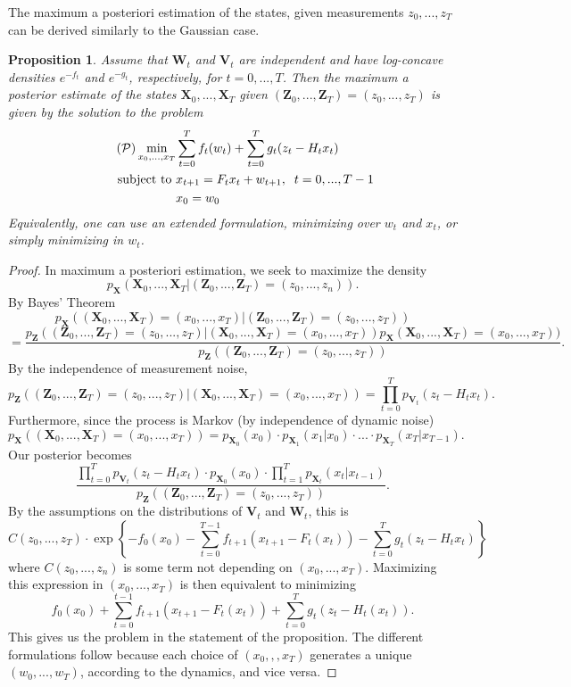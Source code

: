 \documentclass[12pt]{article}
\renewcommand{\vec}[1]{\mathbf{#1}}
\newtheorem{proposition}[theorem]{Proposition}
\theoremstyle{remark}
\theoremstyle{remark}
\begin{document}
The maximum a posteriori estimation of the states,
given measurements $z_{0},...,z_{T}$ can be derived similarly to the
Gaussian case.
\begin{proposition}
Assume that $\vec{W}_{t}$ and $\vec{V}_{t}$ are independent and
have log-concave densities $e^{-f_{t}}$ and $e^{-g_{t}}$,
respectively, for $t=0,...,T$. Then the maximum a posterior estimate
of the states $\vec{X}_{0},...,\vec{X}_{T}$ given
$(\vec{Z}_{0},...,\vec{Z}_{T})=(z_{0},...,z_{T})$ is given by the
solution to the problem
\begin{align*} \label{prob:EstConv} \tag{$\mathcal{P}$}
\min_{x_{0},...,x_{T}} & \sum_{t=0}^{T} f_{t}(w_{t}) +
\sum_{t=0}^{T} g_{t}(z_{t} - H_{t} x_{t}) \\
\text{subject to } & x_{t+1} = F_{t} x_{t} + w_{t+1}, \; \;
t=0,...,T-1\\
& x_{0} = w_{0} \\
\end{align*}
Equivalently, one can use an extended formulation, minimizing over
$w_{t}$ and $x_{t}$, or simply minimizing in $w_{t}$.
\end{proposition}
\begin{proof}
In maximum a posteriori estimation, we seek to maximize the density
$$p_{\vec{X}}(\vec{X}_{0},...,\vec{X}_{T} |
(\vec{Z}_{0},...,\vec{Z}_{T}) = (z_{0},...,z_{n})).$$
By Bayes' Theorem
$$p_{\vec{X}}((\vec{X}_{0},...,\vec{X}_{T})=(x_{0},...,x_{T})|
(\vec{Z}_{0},...,\vec{Z}_{T})=(z_{0},...,z_{T})) $$
$$= \frac{p_{\vec{Z}}((\vec{Z}_{0},...,\vec{Z}_{T})=(z_{0},...,z_{T})|
(\vec{X}_{0},...,\vec{X}_{T})=(x_{0},...,x_{T})) 
p_{\vec{X}}(\vec{X}_{0},...,\vec{X}_{T})=(x_{0},...,x_{T}))}{p_{\vec{Z}}((\vec{Z}_{0},...,\vec{Z}_{T})=(z_{0},...,z_{T}))}.$$
By the independence of measurement noise,
$$p_{\vec{Z}}((\vec{Z}_{0},...,\vec{Z}_{T})=(z_{0},...,z_{T})|
(\vec{X}_{0},...,\vec{X}_{T})=(x_{0},...,x_{T})) = \prod_{t=0}^{T}
p_{\vec{V}_{t}}(z_{t} - H_{t} x_{t}).$$
Furthermore, since the process is Markov (by independence of dynamic
noise)
$$p_{\vec{X}}((\vec{X}_{0},..., \vec{X}_{T})=(x_{0},...,x_{T}))
= p_{\vec{X}_0}(x_{0}) \cdot p_{\vec{X}_{1}}(x_{1}|x_{0}) \cdot ...
\cdot  p_{\vec{X}_{T}}(x_{T}|x_{T-1}).$$
Our posterior becomes
$$\frac{\prod_{t=0}^{T} p_{\vec{V}_{t}}(z_{t}-H_{t} x_{t}) \cdot
p_{\vec{X}_{0}}(x_{0}) \cdot
\prod_{t=1}^{T} p_{\vec{X}_{t}}(x_{t} |
x_{t-1})}{p_{\vec{Z}}((\vec{Z}_{0},...,\vec{Z}_{T})=(z_{0},...,z_{T}))}.$$
By the assumptions on the distributions of $\vec{V}_{t}$ and
$\vec{W}_{t}$, this is
$$C(z_{0},...,z_{T}) \cdot \exp \left\{- f_{0}(x_{0}) 
- \sum_{t=0}^{T-1} f_{t+1}(x_{t+1} - F_{t}(x_{t}))
 -\sum_{t=0}^{T} g_{t}(z_{t} - H_{t} x_{t}) \right \}$$
where $C(z_{0},...,z_{n})$ is some term not depending on
$(x_{0},...,x_{T})$. Maximizing this expression in $(x_{0},...,x_{T})$
is then equivalent to minimizing
$$f_{0}(x_{0}) +
\sum_{t=0}^{t-1} f_{t+1}(x_{t+1} - F_{t}(x_{t}))+ \sum_{t=0}^{T} g_{t}(z_{t}-
H_{t} (x_{t})).$$
This gives us the problem in the statement of the proposition. The
different formulations follow because each choice of $(x_{0},,,x_{T})$
generates a unique $(w_{0},...,w_{T})$, according to the dynamics, and
vice versa.
\end{proof}
\end{document}
